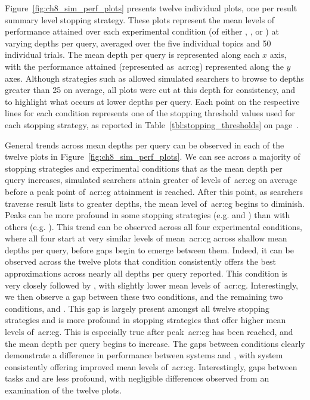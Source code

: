 Figure~\ref{fig:ch8_sim_perf_plots} presents twelve individual plots, one per result summary level stopping strategy. These plots represent the mean levels of performance attained over each experimental condition (of either , ,  or ) at varying depths per query, averaged over the five individual topics and 50 individual trials. The mean depth per query is represented along each $x$ axis, with the performance attained (represented as~\gls{acr:cg}) represented along the $y$ axes. Although strategies such as  allowed simulated searchers to browse to depths greater than 25 on average, all plots were cut at this depth for consistency, and to highlight what occurs at lower depths per query. Each point on the respective lines for each condition represents one of the stopping threshold values used for each stopping strategy, as reported in Table~\ref{tbl:stopping_thresholds} on page~\pageref{tbl:stopping_thresholds}.

General trends across mean depths per query can be observed in each of the twelve plots in Figure~\ref{fig:ch8_sim_perf_plots}. We can see across a majority of stopping strategies and experimental conditions that as the mean depth per query increases, simulated searchers attain greater of levels of~\gls{acr:cg} on average before a peak point of~\gls{acr:cg} attainment is reached. After this point, as searchers traverse result lists to greater depths, the mean level of~\gls{acr:cg} begins to diminish. Peaks can be more profound in some stopping strategies (e.g.  and ) than with others (e.g. ). This trend can be observed across all four experimental conditions, where all four start at very similar levels of mean~\gls{acr:cg} across shallow mean depths per query, before gaps begin to emerge between them. Indeed, it can be observed across the twelve plots that condition  consistently offers the best approximations across nearly all depths per query reported. This condition is very closely followed by , with slightly lower mean levels of~\gls{acr:cg}. Interestingly, we then observe a gap between these two conditions, and the remaining two conditions,  and . This gap is largely present amongst all twelve stopping strategies and is more profound in stopping strategies that offer higher mean levels of~\gls{acr:cg}. This is especially true after peak~\gls{acr:cg} has been reached, and the mean depth per query begins to increase. The gaps between conditions clearly demonstrate a difference in performance between systems  and , with system  consistently offering improved mean levels of~\gls{acr:cg}. Interestingly, gaps between tasks  and  are less profound, with negligible differences observed from an examination of the twelve plots.

